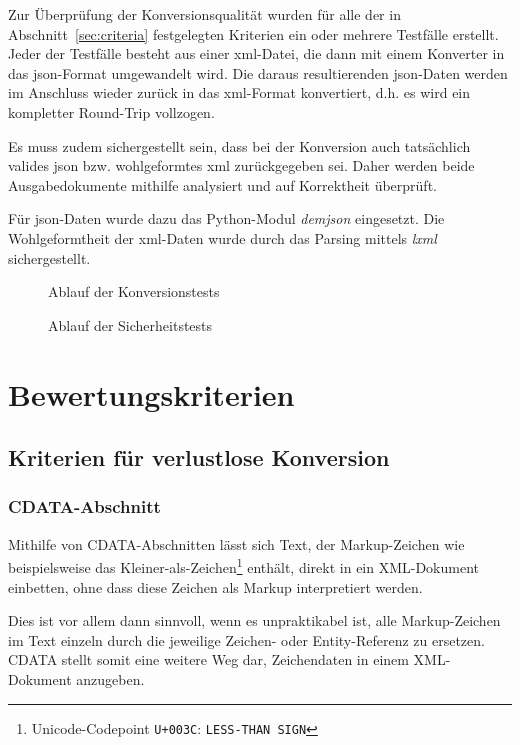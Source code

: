 Zur Überprüfung der Konversionsqualität wurden für alle der in Abschnitt~\ref{sec:criteria} festgelegten Kriterien ein oder mehrere Testfälle erstellt. Jeder der Testfälle besteht aus einer \acrshort{xml}-Datei, die dann mit einem Konverter in das \acrshort{json}-Format umgewandelt wird. Die daraus resultierenden \acrshort{json}-Daten werden im Anschluss wieder zurück in das \acrshort{xml}-Format konvertiert, d.h. es wird ein kompletter Round-Trip vollzogen.

Es muss zudem sichergestellt sein, dass bei der Konversion auch tatsächlich valides \acrshort{json} bzw. wohlgeformtes \acrshort{xml} zurückgegeben sei. Daher werden beide Ausgabedokumente mithilfe analysiert und auf Korrektheit überprüft.

Für \acrshort{json}-Daten wurde dazu das Python-Modul \emph{demjson} eingesetzt. Die Wohlgeformtheit der \acrshort{xml}-Daten wurde durch das Parsing mittels \emph{lxml} sichergestellt.

\begin{figure}
    
    \caption{Ablauf der Konversionstests}
\end{figure}

\begin{figure}
    
    \caption{Ablauf der Sicherheitstests}
\end{figure}

\section{Bewertungskriterien}

\subsection{Kriterien für verlustlose Konversion}

\subsubsection{CDATA-Abschnitt}

Mithilfe von CDATA-Abschnitten lässt sich Text, der Markup-Zeichen wie beispielsweise das Kleiner-als-Zeichen\footnote{Unicode-Codepoint \texttt{U+003C}: \texttt{LESS-THAN SIGN}} enthält, direkt in ein XML-Dokument einbetten, ohne dass diese Zeichen als Markup interpretiert werden.

Dies ist vor allem dann sinnvoll, wenn es unpraktikabel ist, alle Markup-Zeichen im Text einzeln durch die jeweilige Zeichen- oder Entity-Referenz zu ersetzen. CDATA stellt somit eine weitere Weg dar, Zeichendaten in einem XML-Dokument anzugeben.\cite[Abschnitt~2.4]{maler2008xml}

